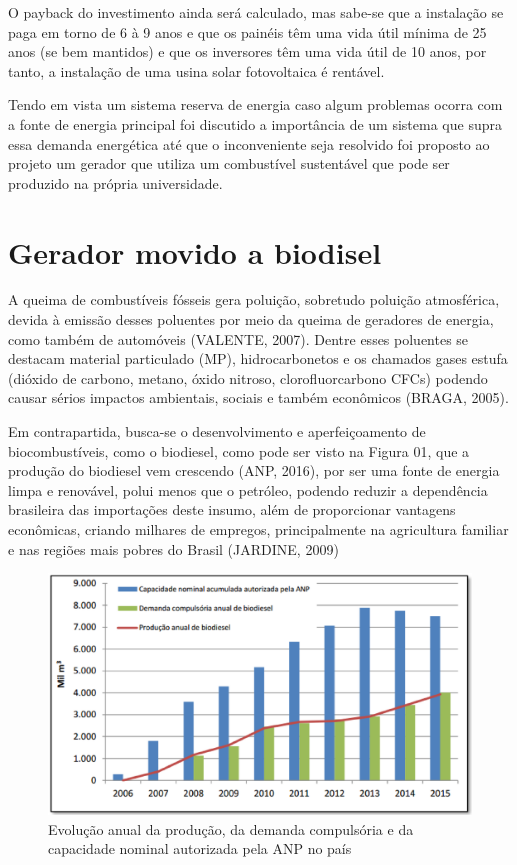 O payback do investimento ainda será calculado, mas sabe-se que a instalação se paga em torno de 6 à 9 anos e que os painéis têm uma vida útil mínima de 25 anos (se bem mantidos) e que os inversores têm uma vida útil de 10 anos, por tanto, a instalação de uma usina solar fotovoltaica é rentável.

Tendo em vista um sistema reserva de energia caso algum problemas ocorra com a fonte de energia principal foi discutido a importância de um sistema que supra essa demanda energética até que o inconveniente seja resolvido foi proposto ao projeto um gerador que utiliza um combustível sustentável que pode ser produzido na própria universidade.

\section{Gerador movido a biodisel}

A queima de combustíveis fósseis gera poluição, sobretudo poluição atmosférica, devida à emissão desses poluentes por meio da queima de geradores de energia, como também de automóveis (VALENTE, 2007). Dentre esses poluentes se destacam material particulado (MP), hidrocarbonetos e os chamados gases estufa (dióxido de carbono, metano, óxido nitroso, clorofluorcarbono CFCs) podendo causar sérios impactos ambientais, sociais e também econômicos (BRAGA, 2005).

Em contrapartida, busca-se o desenvolvimento e aperfeiçoamento de biocombustíveis, como o biodiesel, como pode ser visto na Figura 01, que a produção do biodiesel vem crescendo (ANP, 2016), por ser uma fonte de energia limpa e renovável, polui menos que o petróleo, podendo reduzir a dependência brasileira das importações deste insumo, além de proporcionar vantagens econômicas, criando milhares de empregos, principalmente na agricultura familiar e nas regiões mais pobres do Brasil (JARDINE, 2009)
\pagebreak
 \begin{figure}[!h]
 	\centering
\includegraphics[keepaspectratio=true,scale=0.5]{figuras/producao.eps}
 	\caption{Evolução anual da produção, da demanda compulsória e da capacidade nominal autorizada pela ANP no país}
 	\label{fig02242}
\end{figure}

